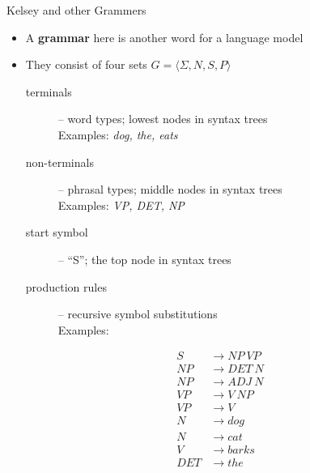 \documentclass[xcolor=pdftex,x11names,table,hyperref]{beamer}
\newcommand{\detail}[1]{{\color{lightgrey}\small{}#1}}
\begin{document}
\begin{frame}{Kelsey and other Grammers}
\begin{itemize}
	\item A \textbf{grammar} here is another word for a language model
	\item They consist of four sets \detail{$G = \langle \Sigma, N, S, P \rangle$}
		\begin{description}
			\item[terminals] -- word types; lowest nodes in syntax trees \\ Examples: \textit{dog, the, eats}
			\item[non-terminals] -- phrasal types;  middle nodes in syntax trees \\ Examples: \textit{VP, DET, NP}
			\item[start symbol] -- ``S''; the top node in syntax trees
			\pause
		\item[production rules] -- recursive symbol substitutions \\ Examples:
		\end{description}
		\vspace{-1.0em}
		\begin{footnotesize}
		\begin{spacing}{0.6}
		\begin{align*}
			S & \rightarrow NP \ VP \\
			NP & \rightarrow DET \ N \\
			NP & \rightarrow ADJ \ N \\
			VP & \rightarrow V \ NP \\
			VP & \rightarrow V \\
			N & \rightarrow dog \\
			N & \rightarrow cat \\
			V & \rightarrow barks \\
			DET & \rightarrow the \\
		\end{align*}
		\end{spacing}
		\end{footnotesize}
\end{itemize}
\end{frame}
\end{document}
